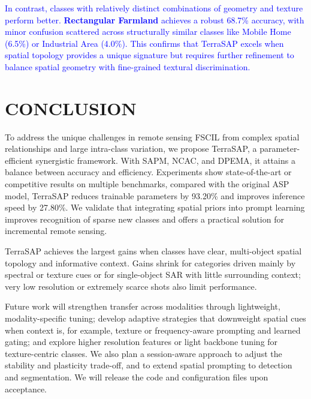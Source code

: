 ﻿\documentclass[letterpaper,journal]{IEEEtran}
\begin{document}
\textcolor{blue}{In contrast, classes with relatively distinct combinations of geometry and texture perform better. \textbf{Rectangular Farmland} achieves a robust 68.7\% accuracy, with minor confusion scattered across structurally similar classes like Mobile Home (6.5\%) or Industrial Area (4.0\%). This confirms that TerraSAP excels when spatial topology provides a unique signature but requires further refinement to balance spatial geometry with fine-grained textural discrimination.}

\section{CONCLUSION}

To address the unique challenges in remote sensing FSCIL from complex spatial relationships and large intra-class variation, we propose TerraSAP, a parameter-efficient synergistic framework. With SAPM, NCAC, and DPEMA, it attains a balance between accuracy and efficiency. Experiments show state-of-the-art or competitive results on multiple benchmarks, compared with the original ASP model, TerraSAP reduces trainable parameters by 93.20\% and improves inference speed by 27.80\%. We validate that integrating spatial priors into prompt learning improves recognition of sparse new classes and offers a practical solution for incremental remote sensing.

TerraSAP achieves the largest gains when classes have clear, multi-object spatial topology and informative context. Gains shrink for categories driven mainly by spectral or texture cues or for single-object SAR with little surrounding context; very low resolution or extremely scarce shots also limit performance.

Future work will strengthen transfer across modalities through lightweight, modality-specific tuning; develop adaptive strategies that downweight spatial cues when context is, for example, texture or frequency-aware prompting and learned gating; and explore higher resolution features or light backbone tuning for texture-centric classes. We also plan a session-aware approach to adjust the stability and plasticity trade-off, and to extend spatial prompting to detection and segmentation. We will release the code and configuration files upon acceptance.



\end{document}
